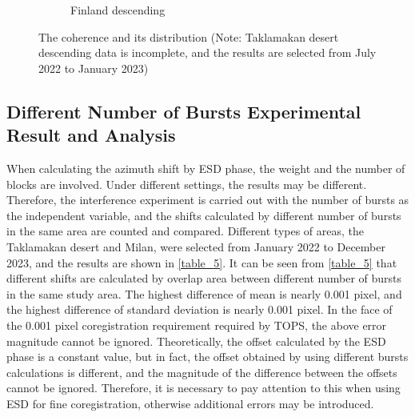 \documentclass[a4paper,fleqn]{cas-sc}
\begin{document}
\begin{figure}
\begin{subfigure}{0.5\textwidth}
\begin{minipage}{0.5\textwidth}
        \end{minipage}
        \caption{Finland descending}
        \label{fig_6i}
    \end{subfigure}%
    \caption{The coherence and its distribution (Note: Taklamakan desert descending data is incomplete, and the results are selected from July 2022 to January 2023)}
    \label{fig_6}
\end{figure}

\subsection{Different Number of Bursts Experimental Result and Analysis}

When calculating the azimuth shift by ESD phase, the weight and the number of blocks are involved. Under different settings, the results may be different. Therefore, the interference experiment is carried out with the number of bursts as the independent variable, and the shifts calculated by different number of bursts in the same area are counted and compared. Different types of areas, the Taklamakan desert and Milan, were selected from January 2022 to December 2023, and the results are shown in \ref{table_5}. It can be seen from \ref{table_5} that different shifts are calculated by overlap area between different number of bursts in the same study area. The highest difference of mean is nearly 0.001 pixel, and the highest difference of standard deviation is nearly 0.001 pixel. In the face of the 0.001 pixel coregistration requirement required by TOPS, the above error magnitude cannot be ignored. Theoretically, the offset calculated by the ESD phase is a constant value, but in fact, the offset obtained by using different bursts calculations is different, and the magnitude of the difference between the offsets cannot be ignored. Therefore, it is necessary to pay attention to this when using ESD for fine coregistration, otherwise additional errors may be introduced. \par
\end{document}
